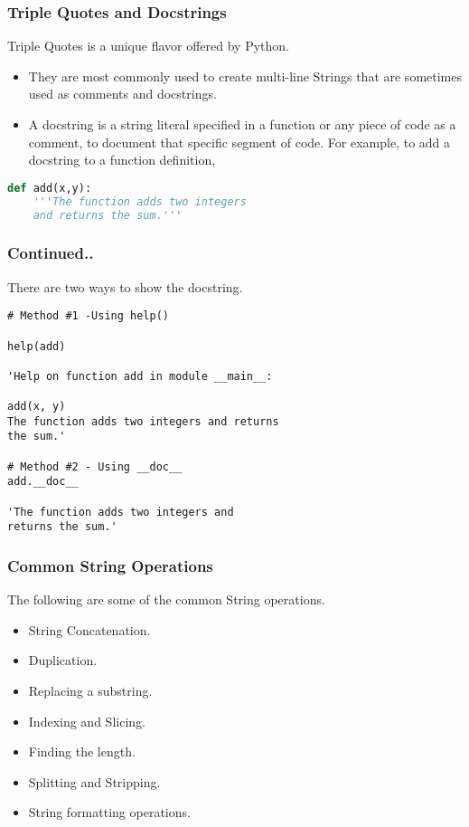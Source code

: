 \documentclass{beamer}
\begin{document}
\begin{frame}[fragile]
\frametitle{Triple Quotes and Docstrings}
Triple Quotes is a unique flavor offered by Python.
\begin{itemize}
\item They are most commonly used to create multi-line Strings that are sometimes used as comments and docstrings.
\item A docstring is a string literal specified in a function or any piece of code as a comment, to document that specific segment of code. For example, to add a docstring to a function definition,
 
\end{itemize}

\begin{lstlisting}[language=Python]
def add(x,y):
	'''The function adds two integers
	and returns the sum.'''
\end{lstlisting}
\end{frame}

\begin{frame}[fragile]
\frametitle{Continued..}
There are two ways to show the docstring.

\begin{lstlisting}
# Method #1 -Using help()

help(add)

'Help on function add in module __main__:

add(x, y)
The function adds two integers and returns 
the sum.'

# Method #2 - Using __doc__	
add.__doc__

'The function adds two integers and 
returns the sum.'
\end{lstlisting}
\end{frame}

\begin{frame}
\frametitle{Common String Operations}
The following are some of the common String operations.
\begin{itemize}
\item String Concatenation.
\item Duplication.
\item Replacing a substring.
\item Indexing and Slicing.
\item Finding the length.
\item Splitting and Stripping.
\item String formatting operations.
\end{itemize}
\end{frame}
\end{document}
